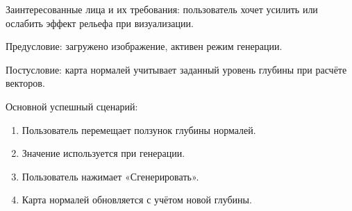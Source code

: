 Заинтересованные лица и их требования: пользователь хочет усилить или ослабить эффект рельефа при визуализации.

Предусловие: загружено изображение, активен режим генерации.

Постусловие: карта нормалей учитывает заданный уровень глубины при расчёте векторов.

Основной успешный сценарий:
\begin{enumerate}
	\item Пользователь перемещает ползунок глубины нормалей.
	\item Значение используется при генерации.
	\item Пользователь нажимает «Сгенерировать».
	\item Карта нормалей обновляется с учётом новой глубины.
\end{enumerate}